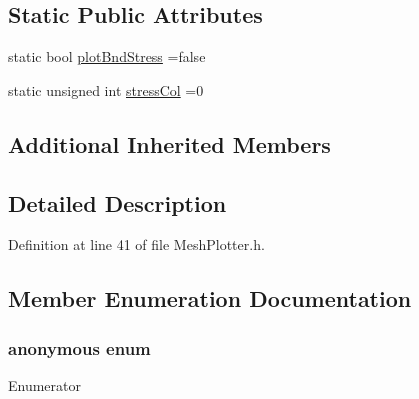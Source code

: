 \subsection*{Static Public Attributes}
\begin{DoxyCompactItemize}
\item 
static bool \hyperlink{classmodel_1_1_mesh_plotter_aa4511dabafce7dcadb38ada5f4b89508}{plot\+Bnd\+Stress} =false
\item 
static unsigned int \hyperlink{classmodel_1_1_mesh_plotter_ac9e6c8695ff72eb2fccab3da7bb6daf0}{stress\+Col} =0
\end{DoxyCompactItemize}
\subsection*{Additional Inherited Members}


\subsection{Detailed Description}


Definition at line 41 of file Mesh\+Plotter.\+h.



\subsection{Member Enumeration Documentation}
\hypertarget{classmodel_1_1_mesh_plotter_a55919b8d75885879e97478801bd84b74}{}\subsubsection[{anonymous enum}]{\setlength{\rightskip}{0pt plus 5cm}anonymous enum}\label{classmodel_1_1_mesh_plotter_a55919b8d75885879e97478801bd84b74}
\begin{Desc}
\item[Enumerator]\par
\begin{description}
\item[{\em 
\hypertarget{classmodel_1_1_mesh_plotter_a55919b8d75885879e97478801bd84b74a4d29b0e5d3671e5c619b56278761d934}{}show\+Mesh\+States\label{classmodel_1_1_mesh_plotter_a55919b8d75885879e97478801bd84b74a4d29b0e5d3671e5c619b56278761d934}
}]\end{description}
\end{Desc}


